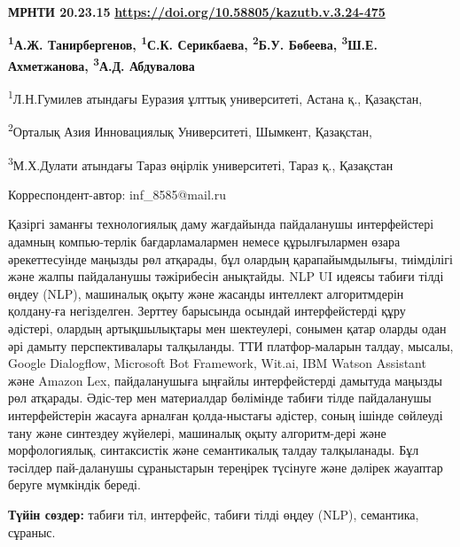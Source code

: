 \newpage
{\bfseries МРНТИ 20.23.15}
\hfill {\bfseries \href{https://doi.org/10.58805/kazutb.v.3.24-475}{https://doi.org/10.58805/kazutb.v.3.24-475}}


\begin{center}
{\bfseries \textsuperscript{1}А.Ж. Танирбергенов, \textsuperscript{1}С.К.
Серикбаева\envelope, \textsuperscript{2}Б.У. Бөбеева,
\textsuperscript{3}Ш.Е. Ахметжанова, \textsuperscript{3}А.Д. Абдувалова}

\textsuperscript{1}Л.Н.Гумилев атындағы Еуразия ұлттық университеті,
Астана қ., Қазақстан,

\textsuperscript{2}Орталық Азия Инновациялық Университеті, Шымкент,
Қазақстан,

\textsuperscript{3}М.Х.Дулати атындағы Тараз өңірлік университеті, Тараз
қ., Қазақстан
\end{center}
\envelope Корреспондент-автор:  inf\_8585@mail.ru \vspace{0.5cm}

Қазіргі заманғы технологиялық даму жағдайында пайдаланушы интерфейстері
адамның компью-терлік бағдарламалармен немесе құрылғылармен өзара
әрекеттесуінде маңызды рөл атқарады, бұл олардың қарапайымдылығы,
тиімділігі және жалпы пайдаланушы тәжірибесін анықтайды. NLP UI идеясы
табиғи тілді өңдеу (NLP), машиналық оқыту және жасанды интеллект
алгоритмдерін қолдану-ға негізделген. Зерттеу барысында осындай
интерфейстерді құру әдістері, олардың артықшылықтары мен шектеулері,
сонымен қатар оларды одан әрі дамыту перспективалары талқыланды. ТТИ
платфор-маларын талдау, мысалы, Google Dialogflow, Microsoft Bot
Framework, Wit.ai, IBM Watson Assistant және Amazon Lex, пайдаланушыға
ыңғайлы интерфейстерді дамытуда маңызды рөл атқарады. Әдіс-тер мен
материалдар бөлімінде табиғи тілде пайдаланушы интерфейстерін жасауға
арналған қолда-ныстағы әдістер, соның ішінде сөйлеуді тану және синтездеу
жүйелері, машиналық оқыту алгоритм-дері және морфологиялық, синтаксистік
және семантикалық талдау талқыланады. Бұл тәсілдер пай-даланушы
сұраныстарын тереңірек түсінуге және дәлірек жауаптар беруге мүмкіндік
береді.

{\bfseries Түйін сөздер:} табиғи тіл, интерфейс, табиғи тілді өңдеу
(NLP), семантика, сұраныс.



